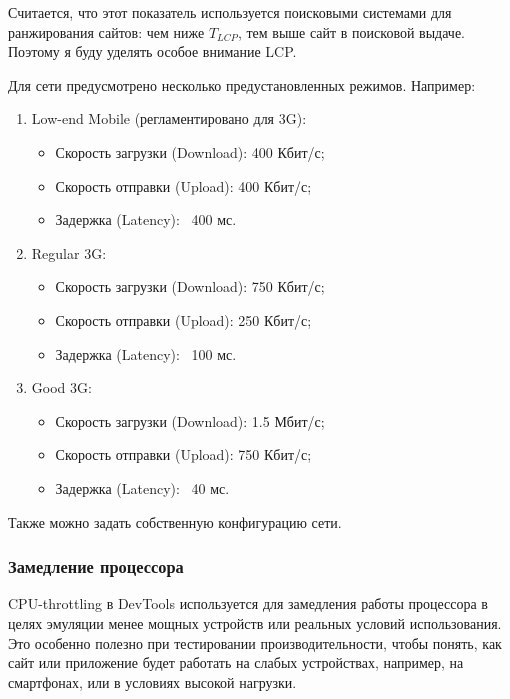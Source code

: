 \documentclass[12pt]{article}
\begin{document}
Считается, что этот показатель используется поисковыми системами для ранжирования сайтов:
чем ниже $T_{LCP}$, тем выше сайт в поисковой выдаче.
Поэтому я буду уделять особое внимание LCP.

Для сети предусмотрено несколько предустановленных режимов. Например:

\begin{enumerate}
    \item Low-end Mobile (регламентировано для 3G):
          \begin{itemize}[label=-]
              \item Скорость загрузки (Download): 400 Кбит/с;
              \item Скорость отправки (Upload): 400 Кбит/с;
              \item Задержка (Latency): ~400 мс.
          \end{itemize}

    \item Regular 3G:
          \begin{itemize}[label=-]
              \item Скорость загрузки (Download): 750 Кбит/с;
              \item Скорость отправки (Upload): 250 Кбит/с;
              \item Задержка (Latency): ~100 мс.
          \end{itemize}

    \item Good 3G:
          \begin{itemize}[label=-]
              \item Скорость загрузки (Download): 1.5 Мбит/с;
              \item Скорость отправки (Upload): 750 Кбит/с;
              \item Задержка (Latency): ~40 мс.
          \end{itemize}
\end{enumerate}

Также можно задать собственную конфигурацию сети.

\subsubsection{Замедление процессора}

CPU-throttling в DevTools используется для замедления работы процессора
в целях эмуляции менее мощных устройств или реальных условий использования.
Это особенно полезно при тестировании производительности, чтобы понять,
как сайт или приложение будет работать на слабых устройствах,
например, на смартфонах, или в условиях высокой нагрузки.
\end{document}
